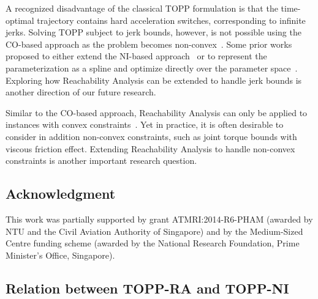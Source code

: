 \documentclass[journal]{IEEEtran}
\theoremstyle{plain}
\theoremstyle{definition}
\theoremstyle{definition}
\begin{document}
A recognized disadvantage of the classical TOPP formulation is that
the time-optimal trajectory contains hard acceleration switches,
corresponding to infinite jerks. Solving TOPP subject to jerk bounds,
however, is not possible using the CO-based approach as the problem
becomes non-convex~\cite{verscheure2008practical}. Some prior works
proposed to either extend the NI-based
approach~\cite{tarkiainen1993time,HungPham2017} or to represent the
parameterization as a spline and optimize directly over the parameter
space~\cite{costantinescu2000smooth,oberherber2015successive}. Exploring
how Reachability Analysis can be extended to handle jerk bounds is
another direction of our future research.

Similar to the CO-based approach, Reachability Analysis can only be
applied to instances with convex
constraints~\cite{verscheure2008practical}. Yet in practice, it is
often desirable to consider in addition non-convex constraints, such
as joint torque bounds with viscous friction effect.  Extending
Reachability Analysis to handle non-convex constraints is another
important research question.

\subsection*{Acknowledgment}

This work was partially supported by grant ATMRI:2014-R6-PHAM (awarded
by NTU and the Civil Aviation Authority of Singapore) and by the
Medium-Sized Centre funding scheme (awarded by the National Research
Foundation, Prime Minister's Office, Singapore).


\appendix
\subsection{Relation between TOPP-RA and TOPP-NI}
\label{sec:relat-with-numer}
\end{document}
